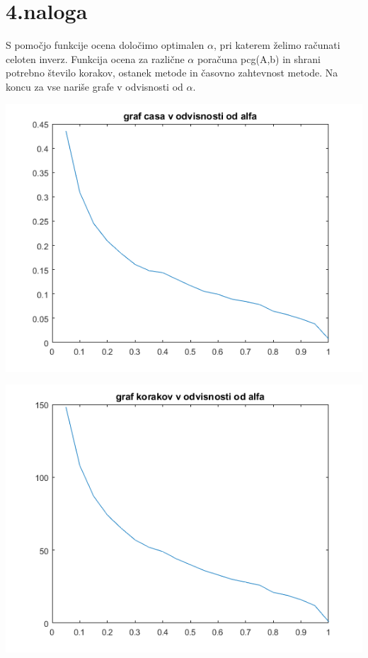 \documentclass[11pt]{article} %
\begin{document}
\section{4.naloga}

S pomočjo funkcije ocena določimo optimalen $\alpha$, pri katerem želimo računati celoten inverz. Funkcija ocena za različne $\alpha$  poračuna pcg(A,b) in shrani potrebno število korakov, ostanek metode in časovno zahtevnost metode. Na koncu za vse nariše grafe v odvisnosti od $\alpha$. 

\begin{centering}
\includegraphics[scale=0.4]{cas}
\end{centering}

\begin{centering}
\includegraphics[scale=0.4]{koraki}
\end{centering}
\end{document}
